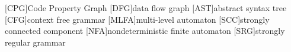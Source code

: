  
[CPG]{Code Property Graph}
[DFG]{data flow graph}
[AST]{abstract syntax tree}
[CFG]{context free grammar}
[MLFA]{multi-level automaton}
[SCC]{strongly connected component}
[NFA]{nondeterministic finite automaton}
[SRG]{strongly regular grammar}
